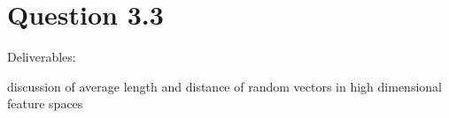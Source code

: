 \section*{Question 3.3}
Deliverables:

discussion of average length and distance of random vectors in high dimensional feature spaces